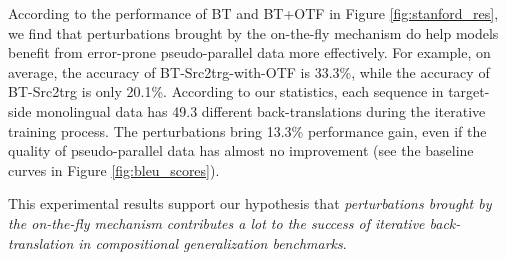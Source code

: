 \documentclass[letterpaper]{article} %
\begin{document}




According to the performance of BT and BT+OTF in Figure \ref{fig:stanford_res}, we find that perturbations brought by the on-the-fly mechanism do help models benefit from error-prone pseudo-parallel data more effectively.
For example, on average, the accuracy of BT-Src2trg-with-OTF is 33.3\%, while the accuracy of BT-Src2trg is only 20.1\%.
According to our statistics, each sequence in target-side monolingual data has 49.3 different back-translations during the iterative training process.
The perturbations bring 13.3\% performance gain, even if the quality of pseudo-parallel data has almost no improvement (see the baseline curves in Figure \ref{fig:bleu_scores}).

This experimental results support our hypothesis that \emph{perturbations brought by the on-the-fly mechanism contributes a lot to the success of iterative back-translation in compositional generalization benchmarks}.
\end{document}
